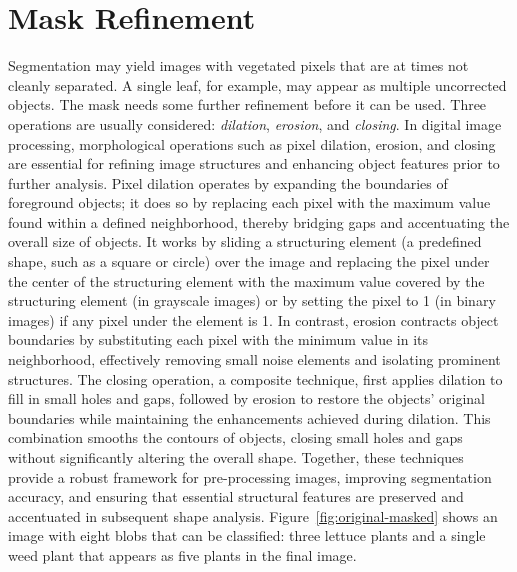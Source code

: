 \documentclass[letterpaper, notitlepage]{report}
\begin{document}
{\section{Mask Refinement}
\label{section:mask-refinement}
Segmentation may yield images with vegetated pixels that are at times not cleanly separated. A single leaf, for example, may appear as multiple uncorrected objects. The mask needs some further refinement before it can be used. Three operations are usually considered: \textit{dilation}, \textit{erosion}, and \textit{closing}. In digital image processing, morphological operations such as pixel dilation, erosion, and closing are essential for refining image structures and enhancing object features prior to further analysis. Pixel dilation operates by expanding the boundaries of foreground objects; it does so by replacing each pixel with the maximum value found within a defined neighborhood, thereby bridging gaps and accentuating the overall size of objects. It works by sliding a structuring element (a predefined shape, such as a square or circle) over the image and replacing the pixel under the center of the structuring element with the maximum value covered by the structuring element (in grayscale images) or by setting the pixel to 1 (in binary images) if any pixel under the element is 1. In contrast, erosion contracts object boundaries by substituting each pixel with the minimum value in its neighborhood, effectively removing small noise elements and isolating prominent structures. The closing operation, a composite technique, first applies dilation to fill in small holes and gaps, followed by erosion to restore the objects' original boundaries while maintaining the enhancements achieved during dilation.  This combination smooths the contours of objects, closing small holes and gaps without significantly altering the overall shape. Together, these techniques provide a robust framework for pre-processing images, improving segmentation accuracy, and ensuring that essential structural features are preserved and accentuated in subsequent shape analysis.
Figure~\ref{fig:original-masked} shows an image with  eight blobs that can be classified: three lettuce plants and a single weed plant that appears as five plants in the final image.


}
\end{document}
